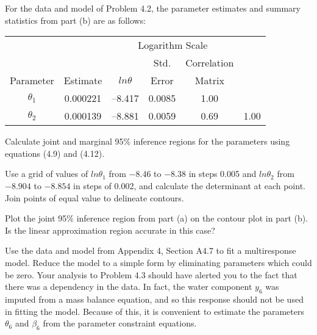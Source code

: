 \begin{problems}
  \prob For the data and model of Problem 4.2, the parameter estimates
  and summary statistics from part (b) are as follows:

  \begin{center}
    \begin{tabular}{ccrccc} \hline
      && \multicolumn{3}{c}{Logarithm Scale}\\
      &&& \multicolumn{1}{c}{Std.} & \multicolumn{1}{c}{Correlation}\\
      \multicolumn{1}{c}{Parameter} & \multicolumn{1}{c}{Estimate} &
      \multicolumn{1}{c}{$ln\theta$}& \multicolumn{1}{c}{Error} &
      \multicolumn{1}{c}{Matrix}\\ \hline
      $\theta_{1}$&0.000221&--8.417&0.0085&1.00\\
      $\theta_{2}$&0.000139&--8.881&0.0059&0.69&1.00\\ \hline
    \end{tabular}
  \end{center}

  \subprob Calculate joint and marginal 95\% inference regions for the
  parameters using equations (4.9) and (4.12).
  
  \subprob Use a grid of values of $ln\theta_1 $ from $-8.46$ to
  $-8.38$ in steps 0.005 and $ln\theta_2 $ from $-8.904$ to $-8.854$
  in steps of 0.002, and calculate the determinant at each point.
  Join points of equal value to delineate contours.
  
  \subprob Plot the joint 95\% inference region from part (a) on the
  contour plot in part (b).  Is the linear approximation region
  accurate in this case?
  
  \prob Use the data and model from Appendix 4, Section A4.7 to fit a
  multiresponse model.  Reduce the model to a simple form by
  eliminating parameters which could be zero.  Your analysis to
  Problem 4.3 should have alerted you to the fact that there was a
  dependency in the data.  In fact, the water component $y_{6}$ was
  imputed from a mass balance equation, and so this response should
  not be used in fitting the model.  Because of this, it is convenient
  to estimate the parameters $\theta_{6}$ and $\beta_{6}$ from the
  parameter constraint equations.
\end{problems}


